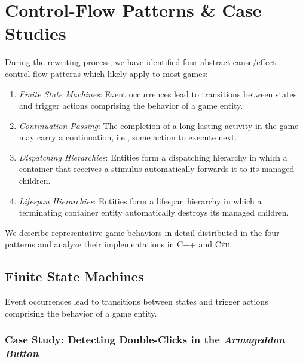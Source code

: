 \documentclass[10pt, conference, compsocconf]{IEEEtran}
\newcommand{\CEU}{\textsc{C\'{e}u}\xspace}
\begin{document}
\section{Control-Flow Patterns \& Case Studies}
\label{sec.pats}

During the rewriting process, we have identified four abstract cause/effect
control-flow patterns which likely apply to most games:

\begin{enumerate}
\item \emph{Finite State Machines}:
    Event occurrences lead to transitions between states and trigger actions
    comprising the behavior of a game entity.
\item \emph{Continuation Passing}:
    The completion of a long-lasting activity in the game may carry a
    continuation, i.e., some action to execute next.
\item \emph{Dispatching Hierarchies}:
    Entities form a dispatching hierarchy in which a container that receives a
    stimulus automatically forwards it to its managed children.
\item \emph{Lifespan Hierarchies}:
    Entities form a lifespan hierarchy in which a terminating container entity
    automatically destroys its managed children.
\end{enumerate}

We describe representative game behaviors in detail distributed in the four
patterns and analyze their implementations in C++ and \CEU.%

\subsection{Finite State Machines}
\label{sec.pats.fsms}

    Event occurrences lead to transitions between states and trigger actions
    comprising the behavior of a game entity.

\subsubsection{Case Study: Detecting Double-Clicks in the \emph{Armageddon Button}}
\end{document}

